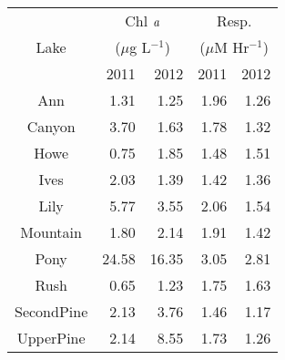 \begin{table}[ht]
\centering
\begin{tabular}{c r r r r }
  \hline
\hline
   & \multicolumn{2}{c}{Chl $\emph{a}$} & 
                      \multicolumn{2}{c}{Resp.} \\
 Lake & \multicolumn{2}{c}{($\mu$g L$^{-1}$)} & 
                      \multicolumn{2}{c}{($\mu$M Hr$^{-1}$)} \\
  & 2011 & 2012 & 2011 & 2012 \\
 \hline
Ann & 1.31 & 1.25 & 1.96 & 1.26 \\ 
  Canyon & 3.70 & 1.63 & 1.78 & 1.32 \\ 
  Howe & 0.75 & 1.85 & 1.48 & 1.51 \\ 
  Ives & 2.03 & 1.39 & 1.42 & 1.36 \\ 
  Lily & 5.77 & 3.55 & 2.06 & 1.54 \\ 
  Mountain & 1.80 & 2.14 & 1.91 & 1.42 \\ 
  Pony & 24.58 & 16.35 & 3.05 & 2.81 \\ 
  Rush & 0.65 & 1.23 & 1.75 & 1.63 \\ 
  SecondPine & 2.13 & 3.76 & 1.46 & 1.17 \\ 
  UpperPine & 2.14 & 8.55 & 1.73 & 1.26 \\ 
   \hline
\end{tabular}
\end{table}
